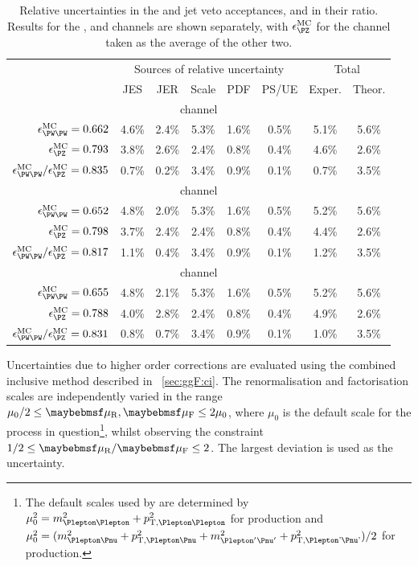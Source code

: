 \begin{table}[t]
	\begin{tabular}{r|ccccc|cc}
		\toprule
		& \multicolumn{5}{c|}{Sources of relative uncertainty} & \multicolumn{2}{c}{Total} \\
		& JES & JER & Scale & PDF & PS/UE & Exper. & Theor. \\
		\midrule
		\multicolumn{8}{c}{\emch channel} \\
		\midrule
		$\epsilon^{\text{MC}}_{\WW} = 0.662$ 
		& 4.6\% & 2.4\% & 5.3\% & 1.6\% & 0.5\% & 5.1\% & 5.6\% \\
		$\epsilon^{\text{MC}}_{\PZ} = 0.793$ 
		& 3.8\% & 2.6\% & 2.4\% & 0.8\% & 0.4\% & 4.6\% & 2.6\% \\
		$\epsilon^{\text{MC}}_{\WW} / \epsilon^{\text{MC}}_{\PZ} = 0.835$ 
		& 0.7\% & 0.2\% & 3.4\% & 0.9\% & 0.1\% & 0.7\% & 3.5\% \\
		\midrule
		\multicolumn{8}{c}{\eech channel} \\
		\midrule
		$\epsilon^{\text{MC}}_{\WW} = 0.652$ 
		& 4.8\% & 2.0\% & 5.3\% & 1.6\% & 0.5\% & 5.2\% & 5.6\% \\
		$\epsilon^{\text{MC}}_{\PZ} = 0.798$ 
		& 3.7\% & 2.4\% & 2.4\% & 0.8\% & 0.4\% & 4.4\% & 2.6\% \\
		$\epsilon^{\text{MC}}_{\WW} / \epsilon^{\text{MC}}_{\PZ} = 0.817$ 
		& 1.1\% & 0.4\% & 3.4\% & 0.9\% & 0.1\% & 1.2\% & 3.5\% \\
		\midrule
		\multicolumn{8}{c}{\mmch channel} \\
		\midrule
		$\epsilon^{\text{MC}}_{\WW} = 0.655$ 
		& 4.8\% & 2.1\% & 5.3\% & 1.6\% & 0.5\% & 5.2\% & 5.6\% \\
		$\epsilon^{\text{MC}}_{\PZ} = 0.788$ 
		& 4.0\% & 2.8\% & 2.4\% & 0.8\% & 0.4\% & 4.9\% & 2.6\% \\
		$\epsilon^{\text{MC}}_{\WW} / \epsilon^{\text{MC}}_{\PZ} = 0.831$ 
		& 0.8\% & 0.7\% & 3.4\% & 0.9\% & 0.1\% & 1.0\% & 3.5\% \\
		\bottomrule
	\end{tabular}
	\caption{Relative uncertainties in the \WW and \PZ jet veto acceptances, and in their 
	ratio. Results for the \eech, \mmch and \emch channels are shown separately, with 
	$\epsilon^{\text{MC}}_{\PZ}$ for the \emch channel taken as the average of the other 
	two.}
	\label{tab:ww:jetveto_unc}
\end{table}

Uncertainties due to higher order corrections are evaluated using the combined inclusive 
method described in \Section~\ref{sec:ggF:ci}. The renormalisation and factorisation 
scales are independently varied in the range $\mu_0/2 \leq \mur,\muf \leq 2\mu_0$, where 
$\mu_0$ is the default scale for the process in question\footnote{
	The default scales used by \mcatnlo are determined by 
	$\mu_0^2 = m_{\Plepton\Plepton}^2 + p_{\text{T,\HepProcess{\Plepton\Plepton}}}^2$ 
	for \PZ production and 
	$\mu_0^2 = (m_{\Plepton\Pnu}^2 + p_{\text{T,\HepProcess{\Plepton\Pnu}}}^2 + 
	m_{\Plepton'\Pnu'}^2 + p_{\text{T,\HepProcess{\Plepton'\Pnu'}}}^2) / 2$
	for \WW production.
}, whilst observing the constraint $1/2 \leq \mur/\muf \leq 2$. The largest deviation is 
used as the uncertainty.


